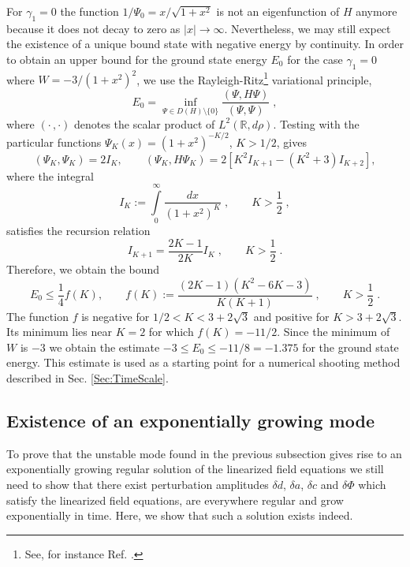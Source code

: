 \documentclass[           %
               showpacs,            %
               preprintnumbers,     %
               aps,                 %
               prd,                 %
               superscriptaddress,      %
               nofootinbib,         %
               tightenlines,        %
               floats,floatfix      %
               ]{revtex4}
\newcommand{\Real}{\mathbb{R}}
\begin{document}
For $\gamma_1 = 0$ the function $1/\Psi_0 = x/\sqrt{1+x^2}$ is not an
eigenfunction of $H$ anymore because it does not decay to zero as
$|x|\to\infty$. Nevertheless, we may still expect the existence of a
unique bound state with negative energy by continuity. In order to
obtain an upper bound for the ground state energy $E_0$ for the case
$\gamma_1=0$ where $W = -3/(1+x^2)^2$, we use the
Rayleigh-Ritz\footnote{See, for instance
  Ref. \cite{CourantHilbert-Book}.}  variational principle,
\begin{equation}
E_0 = \inf\limits_{\Psi\in D(H)\setminus \{ 0 \}} 
\frac{ (\Psi,H\Psi) }{(\Psi,\Psi)} \; ,
\end{equation}
where $(\cdot\, ,\cdot)$ denotes the scalar product of
$L^2(\Real,d\rho)$. Testing with the particular functions $\Psi_K(x) =
(1 + x^2)^{-K/2}$, $K > 1/2$, gives
\begin{displaymath}
(\Psi_K,\Psi_K) = 2I_K, \qquad
(\Psi_K, H\Psi_K) = 2\left[ K^2 I_{K+1} - (K^2+3) I_{K+2} \right],
\end{displaymath}
where the integral
\begin{displaymath}
I_K := \int\limits_0^\infty \frac{dx}{(1 + x^2)^K}\; ,\qquad
K > \frac{1}{2}\; ,
\end{displaymath}
satisfies the recursion relation
\begin{displaymath}
I_{K+1} = \frac{2K-1}{2K} I_K\; ,\qquad K > \frac{1}{2}\; .
\end{displaymath}
Therefore, we obtain the bound
\begin{equation}
E_0 \leq \frac{1}{4} f(K), \qquad
f(K) := \frac{(2K-1)(K^2 - 6K - 3)}{K(K+1)}\; ,\qquad K > \frac{1}{2}\; .
\end{equation}
The function $f$ is negative for $1/2 < K < 3 + 2\sqrt{3}$ and
positive for $K > 3 + 2\sqrt{3}$. Its minimum lies near $K=2$ for
which $f(K) = -11/2$. Since the minimum of $W$ is $-3$ we obtain the
estimate $-3 \leq E_0 \leq -11/8 = -1.375$ for the ground state
energy. This estimate is used as a starting point for a numerical
shooting method described in Sec. \ref{Sec:TimeScale}.


\subsection{Existence of an exponentially growing mode}
\label{Sec:LinStabUnstable}

To prove that the unstable mode found in the previous subsection gives
rise to an exponentially growing regular solution of the linearized
field equations we still need to show that there exist perturbation
amplitudes $\delta d$, $\delta a$, $\delta c$ and $\delta\Phi$ which
satisfy the linearized field equations, are everywhere regular and
grow exponentially in time. Here, we show that such a solution exists
indeed.
\end{document}
